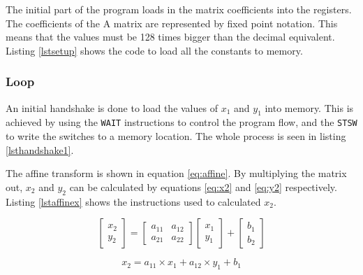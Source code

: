 The initial part of the program loads in the matrix coefficients into the registers. 
The coefficients of the A matrix are represented by fixed point notation. 
This means that the values must be 128 times bigger than the decimal equivalent.
Listing \ref{lstsetup} shows the code to load all the constants to memory.




\subsubsection{Loop}

An initial handshake is done to load the values of $x_1$ and $y_1$ into memory. 
This is achieved by using the \texttt{WAIT} instructions to control the program flow, and the \texttt{STSW} to write the switches to a memory location. 
The whole process is seen in listing \ref{lsthandshake1}.




The affine transform is shown in equation \eqref{eq:affine}.
By multiplying the matrix out, $x_2$ and $y_2$ can be calculated by equations \eqref{eq:x2} and \eqref{eq:y2} respectively. 
Listing \ref{lstaffinex} shows the instructions used to calculated $x_2$. 

\begin{equation}\label{eq:affine}
\begin{bmatrix}
x_2 \\
y_2 
\end{bmatrix}
=
\begin{bmatrix}
a_{11} & a_{12} \\
a_{21} & a_{22} 
\end{bmatrix}
\begin{bmatrix}
x_1 \\
y_1
\end{bmatrix}
+
\begin{bmatrix}
b_1 \\
b_2
\end{bmatrix}
\end{equation}

\begin{equation}\label{eq:x2}
x_2 = a_{11} \times x_1 + a_{12} \times y_1 + b_1
\end{equation}

